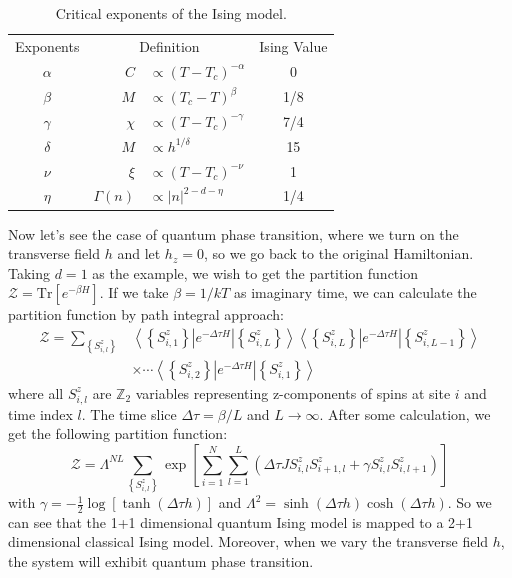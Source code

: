\documentclass{article}
\theoremstyle{plain} \newtheorem{thm}{Theorem}[section]
\theoremstyle{definition} \newtheorem{df}{Definition}[section]
\theoremstyle{definition} \newtheorem{eg}{Example}
\theoremstyle{remark} \newtheorem*{rmk}{Remark}
\begin{document}
\begin{table}[htpb]
  \centering
  \caption{Critical exponents of the Ising model.}
  \label{tab:critical_exponents}
  \begin{tabular}{crlc}
    \toprule
    Exponents & \multicolumn{2}{c}{Definition} & Ising Value \\
    $\alpha$ & $C$ & $ \propto (T-T_c)^{-\alpha}$ & 0 \\
    $\beta$ & $M$ & $ \propto (T_c-T)^\beta$ & 1/8 \\
    $\gamma$ & $\chi$ & $ \propto (T-T_c)^{-\gamma}$ & 7/4 \\
    $\delta$ & $M$ & $ \propto h^{1/\delta}$ & 15 \\
    \midrule
    $\nu$ & $\xi$ & $ \propto (T-T_c)^{-\nu}$ & 1 \\
    $\eta$ & $\varGamma(n)$ & $ \propto |n|^{2-d-\eta}$ & 1/4 \\
    \bottomrule
  \end{tabular}
\end{table}

Now let's see the case of quantum phase transition, where we turn on the transverse field $h$ and let $h_z=0$, so we go back to the original Hamiltonian. Taking $d=1$ as the example, we wish to get the partition function $\mathcal{Z}=\mathrm{Tr}[e^{-\beta H}]$. If we take $\beta=1/kT$ as imaginary time, we can calculate the partition function by path integral approach:
\begin{equation}
  \begin{aligned}
    \mathcal{Z}=\sum_{\left\lbrace S^z_{i,l}\right\rbrace }&\left\langle \left\lbrace S_{i,1}^z\right\rbrace\right|e^{-\Delta\tau H}\left|\left\lbrace S_{i,L}^z\right\rbrace\right\rangle\left\langle \left\lbrace S_{i,L}^z\right\rbrace\left|e^{-\Delta\tau H}\right|\left\lbrace S_{i,L-1}^z\right\rbrace\right\rangle \\
      &\times\cdots\left\langle \left\lbrace S_{i,2}^z\right\rbrace\left|e^{-\Delta\tau H}\right|\left\lbrace S_{i,1}^z\right\rbrace\right\rangle
  \end{aligned}
\end{equation}
where all $S^z_{i,l}$ are $\mathbb{Z}_2$ variables representing z-components of spins at site $i$ and time index $l$. The time slice $\Delta\tau=\beta/L$ and $L \to \infty$. After some calculation, we get the following partition function:
\begin{equation}
	\mathcal{Z}=\Lambda^{NL}\sum_{\left\lbrace S^z_{i,l}\right\rbrace }\exp\left[\sum_{i=1}^N\sum_{l=1}^L\left(\Delta\tau JS^z_{i,l}S^z_{i+1,l}+\gamma S^z_{i,l}S^z_{i,l+1}\right)\right]
\end{equation}
with $\gamma=-\frac{1}{2}\log[ \tanh(\Delta\tau h) ]$ and $\Lambda^2=\sinh(\Delta\tau h)\cosh(\Delta\tau h)$. So we can see that the 1+1 dimensional quantum Ising model is mapped to a 2+1 dimensional classical Ising model. Moreover, when we vary the transverse field $h$, the system will exhibit quantum phase transition.
\end{document}
